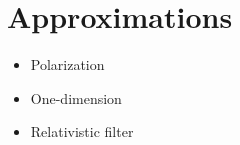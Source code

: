 \section{Approximations}

\begin{itemize}
	\item Polarization
	\item One-dimension
	\item Relativistic filter
\end{itemize}